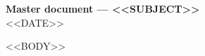 \documentclass[11pt,a4paper]{article}
\begin{document}
{\Large\bfseries Master document — <<SUBJECT>>}\\[2pt]
{\small <<DATE>>}

<<BODY>>
\end{document}
